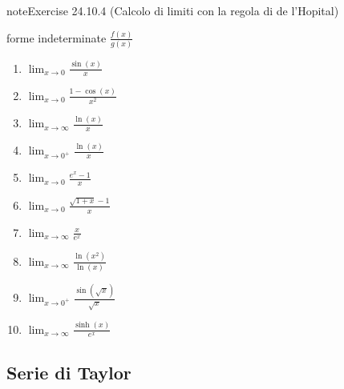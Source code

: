 \documentclass[letterpaper,10pt,italian]{jupyterBook}
\begin{document}
\begin{sphinxadmonition}{note}{Exercise 24.10.4 (Calcolo di limiti con la regola di de l’Hopital)}



\sphinxAtStartPar
forme indeterminate \(\frac{f(x)}{g(x)}\)
\begin{enumerate}
%
\item {} 
\sphinxAtStartPar
\(\lim_{x \to 0} \frac{\sin(x)}{x}\)

\item {} 
\sphinxAtStartPar
\(\lim_{x \to 0} \frac{1 - \cos(x)}{x^2}\)

\item {} 
\sphinxAtStartPar
\(\lim_{x \to \infty} \frac{\ln(x)}{x}\)

\item {} 
\sphinxAtStartPar
\(\lim_{x \to 0^+} \frac{\ln(x)}{x}\)

\item {} 
\sphinxAtStartPar
\(\lim_{x \to 0} \frac{e^x - 1}{x}\)

\item {} 
\sphinxAtStartPar
\(\lim_{x \to 0} \frac{\sqrt{1 + x} - 1}{x}\)

\item {} 
\sphinxAtStartPar
\(\lim_{x \to \infty} \frac{x}{e^x}\)

\item {} 
\sphinxAtStartPar
\(\lim_{x \to \infty} \frac{\ln(x^2)}{\ln(x)}\)

\item {} 
\sphinxAtStartPar
\(\lim_{x \to 0^+} \frac{\sin(\sqrt{x})}{\sqrt{x}}\)

\item {} 
\sphinxAtStartPar
\(\lim_{x \to \infty} \frac{\sinh(x)}{e^x}\)

\end{enumerate}
\end{sphinxadmonition}


\subsection{Serie di Taylor}
\label{\detokenize{ch/infinitesimal_calculus/derivatives-problems:serie-di-taylor}}\label{\detokenize{ch/infinitesimal_calculus/derivatives-problems:infinitesimal-calculus-derivatives-problems-taylor}} \label{exercise:ch/infinitesimal_calculus/derivatives-problems-exercise-4}
\end{document}
